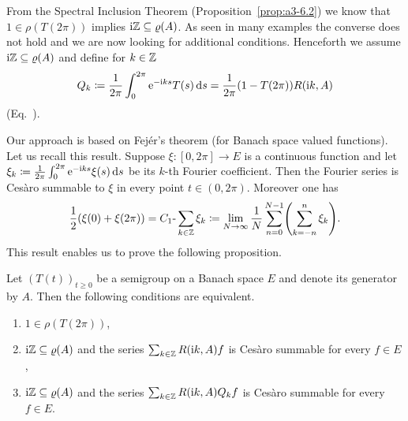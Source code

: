 From the Spectral Inclusion Theorem (Proposition~\ref{prop:a3-6.2}) we know that $1 \in \rho(T(2\pi))$ implies $\im\Z \subseteq \rho(A)$.
As seen in many examples the converse does not hold and we are now looking for additional conditions.
Henceforth we assume $\im\Z \subseteq \rho(A)$ and define for $k \in \mathbb{Z}$
\begin{equation}\label{eq:a3-7.7}
Q_{k}\coloneq \frac{1}{2\pi}\int_{0}^{2\pi} \mathrm{e}^{-\mathrm{i} ks}T(s)\mathop{}\!\mathrm{d}{s} = \frac{1}{2\pi}(1 - T(2\pi))R(\mathrm{i} k,A)
\end{equation}
(\cf Eq.~).

Our approach is based on Fejér's theorem (for Banach space valued functions).
Let us recall this result.
Suppose $\xi \colon [0,2\pi] \to E$ is a continuous function and let $\xi_{k}\coloneq \frac{1}{2\pi}\int_{0}^{2\pi} \mathrm{e}^{-\mathrm{i} ks}\xi(s)\mathop{}\!\mathrm{d}{s}$ be its $k$-th Fourier coefficient.
Then the Fourier series is Cesàro summable to $\xi$ in every point $t \in (0,2\pi)$.
Moreover one has
\begin{equation}\label{eq:a3-7.8}
\frac{1}{2}(\xi(0) + \xi(2\pi)) = C_{1}\text{-}\sum_{k\in\Z} \xi_{k} \coloneq \lim_{N\to\infty} \frac{1}{N}\sum_{n=0}^{N-1}\mleft( \sum_{k=-n}^{n} \xi_{k} \mright) .
\end{equation}
This result enables us to prove the following proposition.
\begin{proposition}\label{prop:a3-7.8}
%
Let $(T(t))_{t\geq 0}$ be a semigroup on a Banach space $E$ and denote its generator by $A$.
Then the following conditions are equivalent.
\begin{enumerate}[\upshape (a)]

\item $1 \in \rho(T(2\pi))$,

\item 
$\im\Z \subseteq \rho(A)$ and the series $\sum_{k\in\mathbb{Z}} R(\mathrm{i} k,A)f$ is Cesàro summable for every $f \in E$,

\item 
$\im\Z \subseteq \rho(A)$ and the series $\sum_{k\in\mathbb{Z}} R(\mathrm{i} k,A)Q_{k}f$ is Cesàro summable for every $f \in E$. 

\end{enumerate}
\end{proposition}
